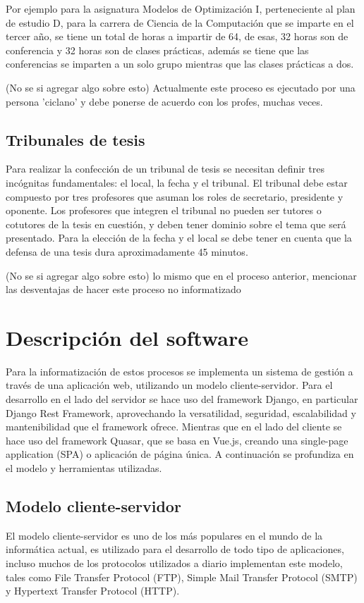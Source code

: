 Por ejemplo para la asignatura Modelos de Optimización I, perteneciente
al plan de estudio D, para la carrera de Ciencia de la Computación que 
se imparte en el tercer año, se tiene un total de horas a impartir de 64,
de esas, 32 horas son de conferencia y 32 horas son de clases prácticas,
además se tiene que las conferencias se imparten a un solo grupo mientras
que las clases prácticas a dos.

(No se si agregar algo sobre esto)
Actualmente este proceso es ejecutado por una persona 'ciclano' y debe
ponerse de acuerdo con los profes, muchas veces.


\subsection{Tribunales de tesis}
Para realizar la confección de un tribunal de tesis
se necesitan definir tres incógnitas fundamentales: el local,
la fecha y el tribunal. El tribunal debe estar compuesto por tres
profesores que asuman los roles de secretario, presidente y 
oponente. Los profesores que integren el tribunal no pueden ser 
tutores o cotutores de la tesis en cuestión, y deben tener dominio
sobre el tema que será presentado.
Para la elección de la fecha y el local se debe tener en cuenta que la 
defensa de una tesis dura aproximadamente 45 minutos.

(No se si agregar algo sobre esto)
lo mismo que en el proceso anterior, mencionar las desventajas de 
hacer este proceso no informatizado




\section{Descripción del software}
Para la informatización de estos procesos se implementa 
un sistema de gestión a través de una aplicación web,
utilizando un modelo cliente-servidor.
Para el desarrollo en el lado del servidor se hace uso del framework Django, en particular Django Rest Framework, aprovechando la
versatilidad, seguridad, escalabilidad y mantenibilidad
que el framework ofrece.
Mientras que en el lado del cliente se hace uso
del framework Quasar, que se basa en Vue.js, creando una
single-page application (SPA) o aplicación de página única.
A continuación se profundiza en el modelo 
y herramientas utilizadas.

\subsection{Modelo cliente-servidor}
El modelo cliente-servidor es uno de los más populares en
el mundo de la informática actual, es utilizado para el 
desarrollo de todo tipo de aplicaciones, incluso muchos 
de los protocolos utilizados a diario implementan este modelo,
tales como File Transfer Protocol (FTP), Simple Mail Transfer Protocol
(SMTP) y Hypertext Transfer Protocol (HTTP).

